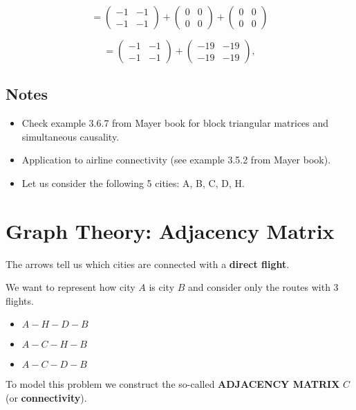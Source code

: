 \[
= \begin{pmatrix}
-1 & -1 \\
-1 & -1
\end{pmatrix}
+ \begin{pmatrix}
0 & 0 \\
0 & 0
\end{pmatrix}
+ \begin{pmatrix}
0 & 0 \\
0 & 0
\end{pmatrix}
\]

\[
= \begin{pmatrix}
-1 & -1 \\
-1 & -1
\end{pmatrix}
+ \begin{pmatrix}
-19 & -19 \\
-19 & -19
\end{pmatrix},
\]

\subsection{Notes}
\begin{itemize}
\item Check example 3.6.7 from Mayer book for block triangular matrices and simultaneous causality.
\item Application to airline connectivity (see example 3.5.2 from Mayer book).
\item Let us consider the following 5 cities: A, B, C, D, H.
\end{itemize}

\section{Graph Theory: Adjacency Matrix}




The arrows tell us which cities are connected with a \textbf{direct flight}.

We want to represent how city $A$ is city $B$ and consider only the routes with 3 flights.

\begin{itemize}
    \item $A - H - D - B$
    \item $A - C - H - B$
    \item $A - C - D - B$
\end{itemize}

To model this problem we construct the so-called \textbf{ADJACENCY MATRIX} $C$ (or \textbf{connectivity}).

